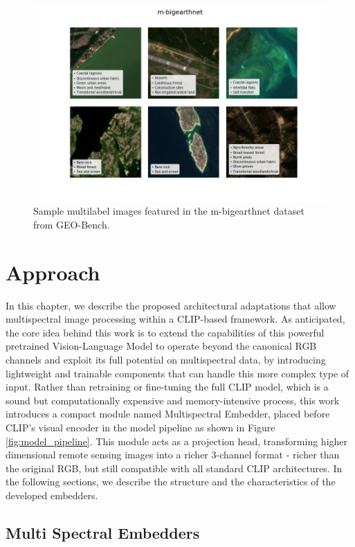 \documentclass[a4paper, oneside, english]{sapthesis} %
\begin{document}
\begin{figure}[h]
    \centering
    \includegraphics[width=\textwidth]{img/m-bigearthnet_image_grid.png}
    \caption{Sample multilabel images featured in the m-bigearthnet dataset from GEO-Bench.}
    \label{fig:bengrid}
\end{figure}


\chapter{Approach} %

In this chapter, we describe the proposed architectural adaptations that allow multispectral image processing within a CLIP-based framework. As anticipated, the core idea behind this work is to extend the capabilities of this powerful pretrained Vision-Language Model to operate beyond the canonical RGB channels and exploit its full potential on multispectral data, by introducing lightweight and trainable components that can handle this more complex type of input.
Rather than retraining or fine-tuning the full CLIP model, which is a sound but computationally expensive and memory-intensive process, this work introduces a compact module named Multispectral Embedder, placed before CLIP's visual encoder in the model pipeline as shown in Figure \ref{fig:model_pipeline}. This module acts as a projection head, transforming higher dimensional remote sensing images into a richer 3-channel format - richer than the original RGB, but still compatible with all standard CLIP architectures. In the following sections, we describe the structure and the characteristics of the developed embedders. 

\section{Multi Spectral Embedders}
\end{document}
